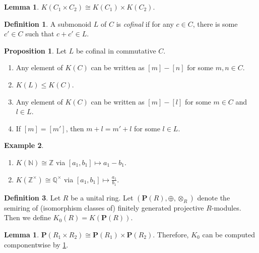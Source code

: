 \documentclass[10pt,letterpaper,cm]{nupset}
\theoremstyle{definition}
\newtheorem{definition}{Definition}
\newtheorem{exmp}[definition]{Example}
\theoremstyle{theorem}
\newtheorem{lemma}[theorem]{Lemma}
\newtheorem{prop}[theorem]{Proposition}
\theoremstyle{remark}
\newcommand{\N}{\mathbb N}
\renewcommand{\P}{\mathbf P}
\newcommand{\Q}{\mathbb Q}
\newcommand{\Z}{\mathbb Z}
\newcommand{\1}{\mathbf{1}}
\newcommand{\0}{\vec 0}
\begin{document}
\begin{lemma}\label{L2}
$K(C_1 \times C_2) \cong K(C_1) \times K(C_2)$.
\end{lemma}

\begin{definition}
A submonoid $L$ of $C$ is \textit{cofinal} if for any $c\in C$, there is some $c' \in C$ such that $c + c' \in L$.
\end{definition}

\begin{prop}\label{prop2} Let $L$ be cofinal in commutative $C$.
\begin{enumerate}
\item Any element of $K(C)$ can be written as $[m]-[n]$ for some $m, n\in  C$.
\item $K(L) \leq K(C)$.
\item Any element of $K(C)$ can be written as $[m] - [l]$ for some $m\in C$ and $l\in L$.
\item If $[m] = [m']$, then $m + l = m' +l$ for some $l\in L$.
\end{enumerate}
\end{prop}

\begin{exmp}\label{Z} $ $
\begin{enumerate}
\item $K(\N) \cong \Z$ via $[a_1, b_1] \mapsto a_1 - b_1$.
\item $K(\Z^{\times}) \cong \Q^{\times}$ via $[a_1, b_1] \mapsto \frac{a_1}{b_1}$.
\end{enumerate}
\end{exmp}

\begin{definition}
Let $R$ be a unital ring. Let $(\P(R), \oplus, \otimes_R)$ denote the semiring  of (isomorphism classes of) finitely generated projective $R$-modules. Then we define $K_0(R) = K(\P(R))$.
\end{definition}

\begin{lemma}
$\P(R_1 \times R_2) \cong \P(R_1) \times \P(R_2)$. Therefore, $K_0$ can be computed componentwise by \cref{L2}. 
\end{lemma}
\end{document}
